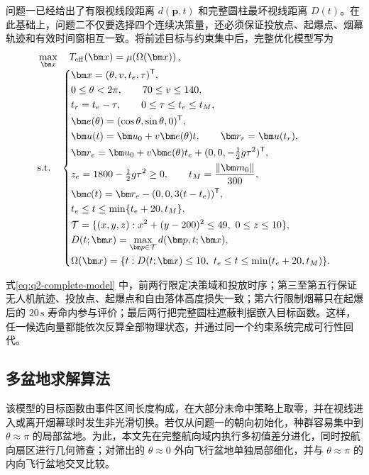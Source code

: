 问题一已经给出了有限视线段距离 $d(\bm p,t)$ 和完整圆柱最坏视线距离 $D(t)$。在此基础上，问题二不仅要选择四个连续决策量，还必须保证投放点、起爆点、烟幕轨迹和有效时间窗相互一致。将前述目标与约束集中后，完整优化模型写为
\begin{equation}
\begin{aligned}
&\max_{\bm x}\quad
T_{\mathrm{eff}}(\bm x)=\mu\!\left(\Omega(\bm x)\right),\\[-1mm]
&\text{\rm s.t.}\quad
\left\{
\begin{aligned}
&\bm x=(\theta,v,t_e,\tau)^{\mathsf T},\\
&0\le\theta<2\pi,\qquad 70\le v\le140,\\
&t_r=t_e-\tau,\qquad 0\le\tau\le t_e\le t_M,\\
&\bm e(\theta)=(\cos\theta,\sin\theta,0)^{\mathsf T},\\
&\bm u(t)=\bm u_0+v\bm e(\theta)t,\qquad \bm r_r=\bm u(t_r),\\
&\bm r_e=\bm u_0+v\bm e(\theta)t_e
 +(0,0,-\tfrac12g\tau^2)^{\mathsf T},\\
&z_e=1800-\tfrac12g\tau^2\ge0,\qquad
t_M=\dfrac{\lVert\bm m_0\rVert}{300},\\
&\bm c(t)=\bm r_e-(0,0,3(t-t_e))^{\mathsf T},\\
&t_e\le t\le\min\{t_e+20,t_M\},\\
&\mathcal T=\{(x,y,z):x^2+(y-200)^2\le49,\ 0\le z\le10\},\\
&D(t;\bm x)=\displaystyle\max_{\bm p\in\mathcal T}d(\bm p,t;\bm x),\\
&\Omega(\bm x)=
\{t:D(t;\bm x)\le10,\ t_e\le t\le\min(t_e+20,t_M)\}.
\end{aligned}
\right.
\end{aligned}
\label{eq:q2-complete-model}
\end{equation}

式\cref{eq:q2-complete-model} 中，前两行限定决策域和投放时序；第三至第五行保证无人机航迹、投放点、起爆点和自由落体高度损失一致；第六行限制烟幕只在起爆后的 $20\,\mathrm{s}$ 寿命内参与评价；最后两行把完整圆柱遮蔽判据嵌入目标函数。这样，任一候选向量都能依次反算全部物理状态，并通过同一个约束系统完成可行性回代。

\subsection{多盆地求解算法}

该模型的目标函数由事件区间长度构成，在大部分未命中策略上取零，并在视线进入或离开烟幕球时发生非光滑切换。若仅从问题一的朝向初始化，种群容易集中到 $\theta\approx\pi$ 的局部盆地。为此，本文先在完整航向域内执行多初值差分进化，同时按航向扇区进行几何筛查；对筛出的 $\theta\approx0$ 外向飞行盆地单独局部细化，并与 $\theta\approx\pi$ 的内向飞行盆地交叉比较。

